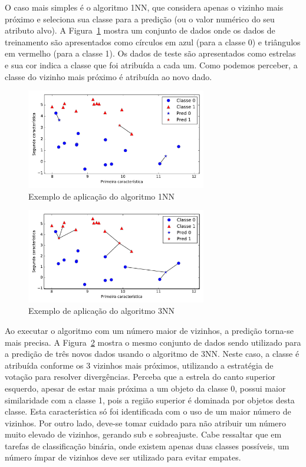 O caso mais simples é o algoritmo 1NN, que considera apenas o vizinho mais próximo e seleciona sua classe para a predição (ou o valor numérico do seu atributo alvo). A Figura~\ref{fig:exemplo-1nn} mostra um conjunto de dados onde os dados de treinamento são apresentados como círculos em azul (para a classe 0) e triângulos em vermelho (para a classe 1). Os dados de teste são apresentados como estrelas e sua cor indica a classe que foi atribuída a cada um. Como podemos perceber, a classe do vizinho mais próximo é atribuída ao novo dado.

\begin{figure}[h]
	\centering
	\includegraphics[width=0.7\textwidth]{img/exemplo-1nn}
	\caption{Exemplo de aplicação do algoritmo 1NN}
	\label{fig:exemplo-1nn}
\end{figure}

\begin{figure}[h]
	\centering
	\includegraphics[width=0.7\textwidth]{img/exemplo-3nn}
	\caption{Exemplo de aplicação do algoritmo 3NN}
	\label{fig:exemplo-3nn}
\end{figure}

Ao executar o algoritmo com um número maior de vizinhos, a predição torna-se mais precisa. A Figura~\ref{fig:exemplo-3nn} mostra o mesmo conjunto de dados sendo utilizado para a predição de três novos dados usando o algoritmo de 3NN. Neste caso, a classe é atribuída conforme os 3 vizinhos mais próximos, utilizando a estratégia de votação para resolver divergências. Perceba que a estrela do canto superior esquerdo, apesar de estar mais próxima a um objeto da classe 0, possui maior similaridade com a classe 1, pois a região superior é dominada por objetos desta classe. Esta característica só foi identificada com o uso de um maior número de vizinhos. Por outro lado, deve-se tomar cuidado para não atribuir um número muito elevado de vizinhos, gerando sub e sobreajuste. Cabe ressaltar que em tarefas de classificação binária, onde existem apenas duas classes possíveis, um número ímpar de vizinhos deve ser utilizado para evitar empates.

